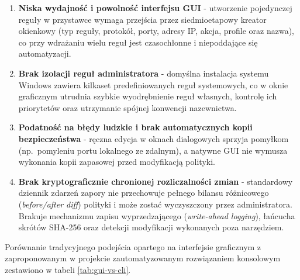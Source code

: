 \begin{enumerate}
    \item \textbf{Niska wydajność i powolność interfejsu GUI} - utworzenie pojedynczej reguły w przystawce  wymaga przejścia przez siedmioetapowy kreator okienkowy (typ reguły, protokół, porty, adresy IP, akcja, profile oraz nazwa), co przy wdrażaniu wielu reguł jest czasochłonne i niepoddające się automatyzacji.
    \item \textbf{Brak izolacji reguł administratora} - domyślna instalacja systemu Windows zawiera kilkaset predefiniowanych reguł systemowych, co w oknie graficznym utrudnia szybkie wyodrębnienie reguł własnych, kontrolę ich priorytetów oraz utrzymanie spójnej konwencji nazewnictwa.
    \item \textbf{Podatność na błędy ludzkie i brak automatycznych kopii bezpieczeństwa} - ręczna edycja w oknach dialogowych sprzyja pomyłkom (np.\ pomyleniu portu lokalnego ze zdalnym), a natywne GUI nie wymusza wykonania kopii zapasowej przed modyfikacją polityki.
    \item \textbf{Brak kryptograficznie chronionej rozliczalności zmian} - standardowy dziennik zdarzeń zapory nie przechowuje pełnego bilansu różnicowego (\textit{before/after diff}) polityki i może zostać wyczyszczony przez administratora. Brakuje mechanizmu zapisu wyprzedzającego (\textit{write-ahead logging}), łańcucha skrótów SHA-256 oraz detekcji modyfikacji wykonanych poza narzędziem.
\end{enumerate}

Porównanie tradycyjnego podejścia opartego na interfejsie graficznym z zaproponowanym w projekcie zautomatyzowanym rozwiązaniem konsolowym zestawiono w tabeli \ref{tab:gui-vs-cli}.

